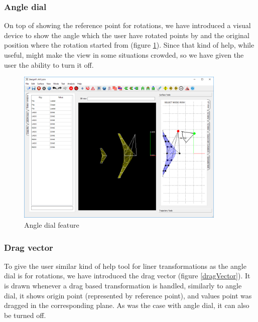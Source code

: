 \documentclass[a4paper, 11pt, article]{report}
\begin{document}
\subsubsection{Angle dial}

On top of showing the reference point for rotations, we have introduced a visual device to show the angle which the user have rotated points by and the original position where the rotation started from (figure \ref{angleDial}). Since that kind of help, while useful, might make the view in some situations crowded, so we have given the user the ability to turn it off.

\begin{figure}[!h]
	\centering
	
	\includegraphics[width=10cm]{images/angle_dial.png}
	
	\caption{Angle dial feature}
	
	\label{angleDial}
\end{figure}

\subsubsection{Drag vector}

To give the user similar kind of help tool for liner transformations as the angle dial is for rotations, we have introduced the drag vector (figure \ref{dragVector}). It is drawn whenever a drag based transformation is handled, similarly to angle dial, it shows origin point (represented by reference point), and values point was dragged in the corresponding plane. As was the case with angle dial, it can also be turned off.
\end{document}
